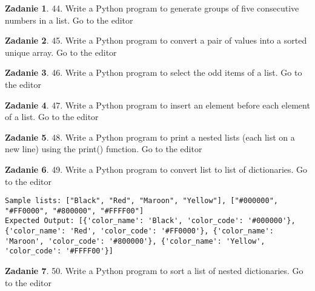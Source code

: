 \documentclass[11pt]{article}
\theoremstyle{definition}
\newtheorem{zadanie}{Zadanie}
\begin{document}
\begin{zadanie}


44. Write a Python program to generate groups of five consecutive numbers in a list. Go to the editor


\end{zadanie}

\begin{zadanie}


45. Write a Python program to convert a pair of values into a sorted unique array. Go to the editor


\end{zadanie}

\begin{zadanie}


46. Write a Python program to select the odd items of a list. Go to the editor


\end{zadanie}

\begin{zadanie}


47. Write a Python program to insert an element before each element of a list. Go to the editor


\end{zadanie}

\begin{zadanie}


48. Write a Python program to print a nested lists (each list on a new line) using the print() function. Go to the editor


\end{zadanie}

\begin{zadanie}


49. Write a Python program to convert list to list of dictionaries. Go to the editor
\begin{verbatim}
Sample lists: ["Black", "Red", "Maroon", "Yellow"], ["#000000", "#FF0000", "#800000", "#FFFF00"]
Expected Output: [{'color_name': 'Black', 'color_code': '#000000'}, {'color_name': 'Red', 'color_code': '#FF0000'}, {'color_name': 'Maroon', 'color_code': '#800000'}, {'color_name': 'Yellow', 'color_code': '#FFFF00'}]
\end{verbatim}

\end{zadanie}

\begin{zadanie}


50. Write a Python program to sort a list of nested dictionaries. Go to the editor


\end{zadanie}
\end{document}
